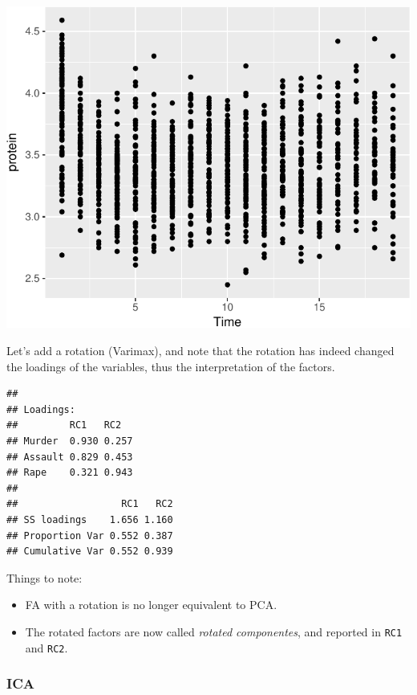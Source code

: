 \documentclass[]{book}
\newenvironment{Shaded}{\begin{snugshade}}{\end{snugshade}}
\newcommand{\DataTypeTok}[1]{\textcolor[rgb]{0.13,0.29,0.53}{#1}}
\newcommand{\DecValTok}[1]{\textcolor[rgb]{0.00,0.00,0.81}{#1}}
\newcommand{\FloatTok}[1]{\textcolor[rgb]{0.00,0.00,0.81}{#1}}
\newcommand{\KeywordTok}[1]{\textcolor[rgb]{0.13,0.29,0.53}{\textbf{#1}}}
\newcommand{\NormalTok}[1]{#1}
\newcommand{\OperatorTok}[1]{\textcolor[rgb]{0.81,0.36,0.00}{\textbf{#1}}}
\newcommand{\StringTok}[1]{\textcolor[rgb]{0.31,0.60,0.02}{#1}}
\providecommand{\tightlist}{%
  \setlength{\itemsep}{0pt}\setlength{\parskip}{0pt}}
\theoremstyle{definition}
\theoremstyle{definition}
\theoremstyle{definition}
\theoremstyle{remark}
\begin{document}
\includegraphics[width=0.5\linewidth]{Rcourse_files/figure-latex/unnamed-chunk-238-1}

Let's add a rotation (Varimax), and note that the rotation has indeed changed the loadings of the variables, thus the interpretation of the factors.

\begin{Shaded}
\end{Shaded}

\begin{verbatim}
## 
## Loadings:
##         RC1   RC2  
## Murder  0.930 0.257
## Assault 0.829 0.453
## Rape    0.321 0.943
## 
##                  RC1   RC2
## SS loadings    1.656 1.160
## Proportion Var 0.552 0.387
## Cumulative Var 0.552 0.939
\end{verbatim}

Things to note:

\begin{itemize}
\tightlist
\item
  FA with a rotation is no longer equivalent to PCA.
\item
  The rotated factors are now called \emph{rotated componentes}, and reported in \texttt{RC1} and \texttt{RC2}.
\end{itemize}

\hypertarget{ica}{%
\subsubsection{ICA}\label{ica}}
\end{document}
